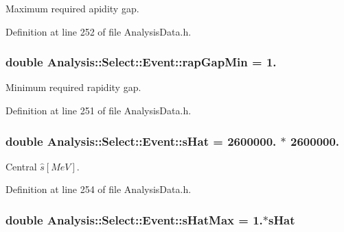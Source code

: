 Maximum required apidity gap. 



Definition at line 252 of file Analysis\+Data.\+h.

\subsubsection[{\texorpdfstring{rap\+Gap\+Min}{rapGapMin}}]{\setlength{\rightskip}{0pt plus 5cm}double Analysis\+::\+Select\+::\+Event\+::rap\+Gap\+Min = 1.\hspace{0.3cm}{\ttfamily [static]}}\hypertarget{namespaceAnalysis_1_1Select_1_1Event_a7b2bce93ace6ef0368b6e38ccd809ed0}{}\label{namespaceAnalysis_1_1Select_1_1Event_a7b2bce93ace6ef0368b6e38ccd809ed0}


Minimum required rapidity gap. 



Definition at line 251 of file Analysis\+Data.\+h.

\subsubsection[{\texorpdfstring{s\+Hat}{sHat}}]{\setlength{\rightskip}{0pt plus 5cm}double Analysis\+::\+Select\+::\+Event\+::s\+Hat = 2600000. $\ast$ 2600000.\hspace{0.3cm}{\ttfamily [static]}}\hypertarget{namespaceAnalysis_1_1Select_1_1Event_ae9452563af166c95dc76ce45889435a1}{}\label{namespaceAnalysis_1_1Select_1_1Event_ae9452563af166c95dc76ce45889435a1}


Central $ \hat{s} [MeV] $. 



Definition at line 254 of file Analysis\+Data.\+h.

\subsubsection[{\texorpdfstring{s\+Hat\+Max}{sHatMax}}]{\setlength{\rightskip}{0pt plus 5cm}double Analysis\+::\+Select\+::\+Event\+::s\+Hat\+Max = 1.$\ast${\bf s\+Hat}\hspace{0.3cm}{\ttfamily [static]}}\hypertarget{namespaceAnalysis_1_1Select_1_1Event_a5a398a3f4f0590598003266da5bb6d9f}{}\label{namespaceAnalysis_1_1Select_1_1Event_a5a398a3f4f0590598003266da5bb6d9f}


